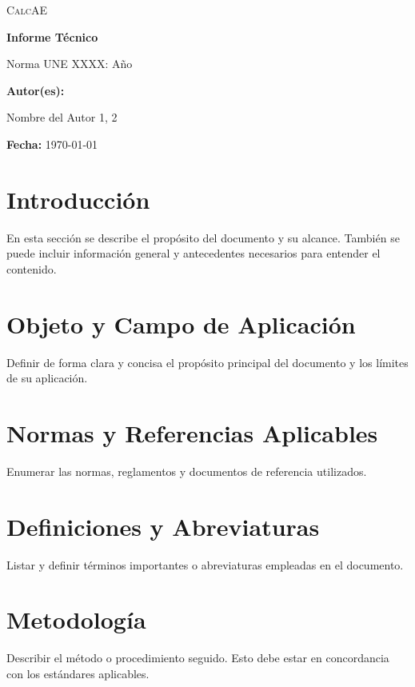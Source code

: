 \documentclass[a4paper,12pt]{article}
\let\OldTextField\TextField
\renewcommand{\TextField}[2][]{%
  \raisebox{-0.1ex}{\OldTextField[height=.95em,  bordercolor={1 1 1}, backgroundcolor={1 1 1},#1]{#2}}%
}
\begin{document}
\begin{Form}


\begin{titlepage}
    \centering
    {\scshape\LARGE CalcAE \par}
    \vspace{1cm}
    {\Huge\bfseries Informe Técnico\par}
    \vspace{2cm}
    {\Large Norma UNE XXXX: Año \par}
    \vspace{1cm}
    \vfill
    \textbf{Autor(es):}\par
    Nombre del Autor 1,\TextField[name=Tecnico,width=4cm,default=Juan Pérez]{} 2\par
    \vspace{0.5cm}
    \textbf{Fecha:} \today \par
\end{titlepage}

\tableofcontents
\newpage

\section{Introducción}
En esta sección se describe el propósito del documento y su alcance. También se puede incluir información general y antecedentes necesarios para entender el contenido.

\section{Objeto y Campo de Aplicación}
Definir de forma clara y concisa el propósito principal del documento y los límites de su aplicación.

\section{Normas y Referencias Aplicables}
Enumerar las normas, reglamentos y documentos de referencia utilizados.

\section{Definiciones y Abreviaturas}
Listar y definir términos importantes o abreviaturas empleadas en el documento.

\section{Metodología}
Describir el método o procedimiento seguido. Esto debe estar en concordancia con los estándares aplicables.


\end{Form}
\end{document}
